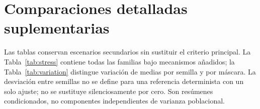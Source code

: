 \appendices
\section{Comparaciones detalladas suplementarias}
Las tablas conservan escenarios secundarios sin sustituir el criterio principal. La Tabla~\ref{tab:stress} contiene todas las familias bajo mecanismos añadidos; la Tabla~\ref{tab:variation} distingue variación de medias por semilla y por máscara. La desviación entre semillas no se define para una referencia determinista con un solo ajuste; no se sustituye silenciosamente por cero. Son resúmenes condicionados, no componentes independientes de varianza poblacional.
\begin{table}[!t]
\caption{MASE descriptivo bajo pérdidas correlacionadas, prolongadas y MAR dependiente del retardo. La etiqueta nominal no equivale siempre a tasa realizada.}\label{tab:stress}
\centering\footnotesize
\FitTable{}
\end{table}
\begin{table}[!t]
\caption{Desviaciones de medias por semilla y máscara, principal con pérdidas. No son incertidumbres de infraestructuras independientes.}\label{tab:variation}
\centering\footnotesize
\FitTable{}
\end{table}
\begin{table}[!t]
\caption{Intervalos95\% cruzados por semilla, máscara y bloques circulares para referencia menos A3. Los bloques24/48/96 equivalen a12/24/48 horas nominales. No se afirma cobertura predictiva o poblacional.}\label{tab:block}
\centering\footnotesize
\FitTable{}
\end{table}
\begin{table}[!t]
\caption{MASE con objetivos comunes: CPU a la izquierda y memoria a la derecha, horizontes en minutos. Tres semillas, cinco máscaras y seis condiciones con pérdidas. H30 es un subconjunto del principal.}\label{tab:horizon}
\centering\footnotesize

\setlength{\tabcolsep}{4pt}
\begin{minipage}[t]{.485\textwidth}
\centering\FitTable{}
\end{minipage}
\hfill
\begin{minipage}[t]{.485\textwidth}
\centering\FitTable{}
\end{minipage}
\end{table}
